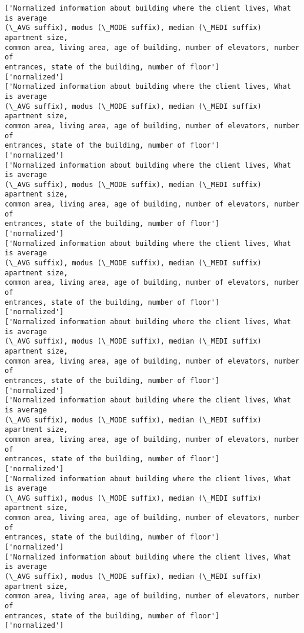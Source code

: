 \documentclass[11pt]{article}
\begin{document}
    \begin{Verbatim}[commandchars=\\\{\}]
['Normalized information about building where the client lives, What is average
(\_AVG suffix), modus (\_MODE suffix), median (\_MEDI suffix) apartment size,
common area, living area, age of building, number of elevators, number of
entrances, state of the building, number of floor']
['normalized']
['Normalized information about building where the client lives, What is average
(\_AVG suffix), modus (\_MODE suffix), median (\_MEDI suffix) apartment size,
common area, living area, age of building, number of elevators, number of
entrances, state of the building, number of floor']
['normalized']
['Normalized information about building where the client lives, What is average
(\_AVG suffix), modus (\_MODE suffix), median (\_MEDI suffix) apartment size,
common area, living area, age of building, number of elevators, number of
entrances, state of the building, number of floor']
['normalized']
['Normalized information about building where the client lives, What is average
(\_AVG suffix), modus (\_MODE suffix), median (\_MEDI suffix) apartment size,
common area, living area, age of building, number of elevators, number of
entrances, state of the building, number of floor']
['normalized']
['Normalized information about building where the client lives, What is average
(\_AVG suffix), modus (\_MODE suffix), median (\_MEDI suffix) apartment size,
common area, living area, age of building, number of elevators, number of
entrances, state of the building, number of floor']
['normalized']
['Normalized information about building where the client lives, What is average
(\_AVG suffix), modus (\_MODE suffix), median (\_MEDI suffix) apartment size,
common area, living area, age of building, number of elevators, number of
entrances, state of the building, number of floor']
['normalized']
['Normalized information about building where the client lives, What is average
(\_AVG suffix), modus (\_MODE suffix), median (\_MEDI suffix) apartment size,
common area, living area, age of building, number of elevators, number of
entrances, state of the building, number of floor']
['normalized']
['Normalized information about building where the client lives, What is average
(\_AVG suffix), modus (\_MODE suffix), median (\_MEDI suffix) apartment size,
common area, living area, age of building, number of elevators, number of
entrances, state of the building, number of floor']
['normalized']
    \end{Verbatim}
\end{document}
